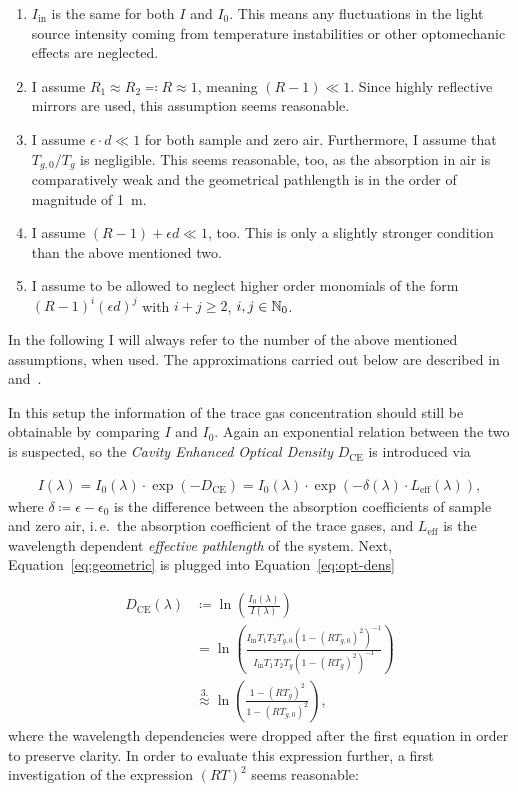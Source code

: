 \begin{enumerate}
\item $I_{\text{in}}$ is the same for both $I$ and $I_0$. This means
  any fluctuations in the light source intensity coming from
  temperature instabilities or other optomechanic effects are
  neglected.
\item I assume $R_1 \approx R_2 \eqqcolon R \approx 1$, meaning $(R -
  1) \ll 1$. Since highly reflective mirrors are used, this assumption
  seems reasonable.
\item I assume $\epsilon \cdot d \ll 1$ for both sample and zero
  air. Furthermore, I assume that $T_{g,0}/T_{g}$ is negligible. This
  seems reasonable, too, as the absorption in 
  air is comparatively weak and the geometrical pathlength is in the
  order of magnitude of \SI{1}{\meter}.
\item I assume $(R - 1) + \epsilon d \ll 1$, too. This is only a
  slightly stronger condition than the above mentioned two.
\item I assume to be allowed to neglect higher order monomials of the
  form $(R-1)^i(\epsilon d)^j$  with $i+j \geq 2$, $i,j \in \mathbb{N}_0$.
\end{enumerate}

In the following I will always refer to the number of the above
mentioned assumptions, when used. The approximations carried out below
are described in~\cite{platt2009} and~\cite{fiedler2003}.

In this setup the information of the trace gas concentration should
still be obtainable by comparing $I$ and $I_0$. Again an exponential
relation between the two is suspected, so the \emph{Cavity Enhanced
  Optical Density} $D_{\text{CE}}$ is introduced via

\begin{align}
  I(\lambda) = I_0(\lambda) \cdot \exp(- D_{\text{CE}}) = I_0(\lambda)
  \cdot \exp(-\delta(\lambda) \cdot L_{\text{eff}}(\lambda)),\label{eq:opt-dens}
\end{align}
where $\delta \coloneqq \epsilon - \epsilon_0$ is the difference
between the absorption coefficients of sample and zero air, i.\,e.\ the
absorption coefficient of the trace gases, and $L_{\text{eff}}$ is the
wavelength dependent \emph{effective pathlength} of the system. Next,
Equation~\eqref{eq:geometric} is plugged into Equation~\eqref{eq:opt-dens}

\begin{align}
  D_{\text{CE}}(\lambda) & \coloneqq \ln\left(
                           \frac{I_0(\lambda)}{I(\lambda)}\right)\nonumber\\
                         & = \ln\left ( \frac{I_{\text{in}}T_1T_2T_{g,0}(1 -
                           (RT_{g,0})^2)^{-1}}{I_{\text{in}}T_1T_2T_g(1 -
                           (RT_g)^2)^{-1}}\right)\nonumber\\
                         & \stackrel{3.}{\approx} \ln\left( \frac{1 -
                           (RT_g)^2}{1 - (RT_{g,0})^2}\right)\label{eq:d_ce},
\end{align}
where the wavelength dependencies were dropped after the first
equation in order to preserve clarity. In order to evaluate this
expression further, a first investigation of the expression $(RT)^2$
seems reasonable:

